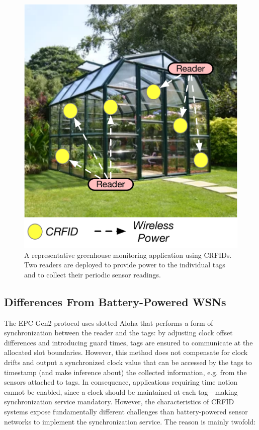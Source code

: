 \documentclass[10pt,journal,compsoc]{IEEEtran}
\begin{document}
\begin{figure}
	\centering
	\includegraphics[width=0.75\columnwidth]{figures/scenario.pdf}
	\caption{\label{fig:motivation}A representative greenhouse monitoring application using CRFIDs. Two readers are deployed to provide power to the individual tags and to collect their periodic sensor readings.}
\end{figure}

\subsection{Differences From Battery-Powered WSNs }
\label{sec:Motivation}

The EPC Gen2 protocol uses slotted Aloha that performs a form of synchronization between the reader and the tags: by adjusting clock offset differences and introducing guard times, tags are ensured to communicate at the allocated slot boundaries. However, this method does not compensate for clock drifts and output a synchronized clock value that can be accessed by the tags to timestamp (and make inference about) the collected information, e.g. from the sensors attached to tags. In consequence, applications requiring time notion cannot be enabled, since a clock should be maintained at each tag---making synchronization service mandatory. However, the characteristics of CRFID systems expose fundamentally different challenges than battery-powered sensor networks to implement the synchronization service. The reason is mainly twofold:
\end{document}
